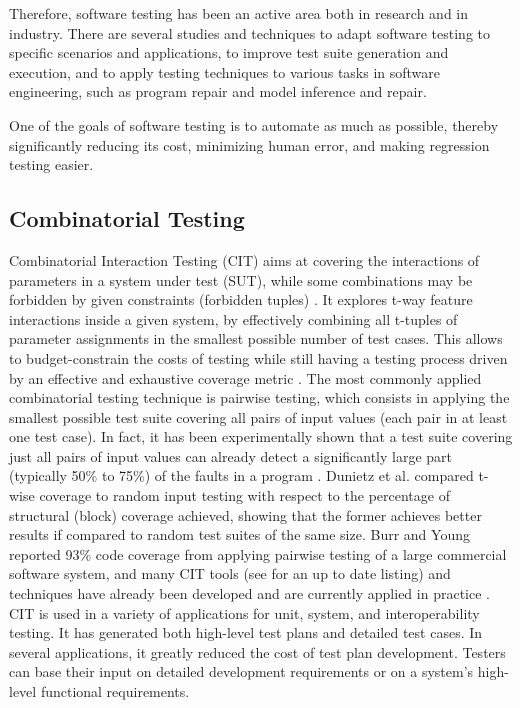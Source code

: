 \documentclass [a4paper, 12pt, twoside]{report}
\theoremstyle{plain}
\theoremstyle{definition}
\theoremstyle{remark}
\theoremstyle{plain}
\theoremstyle{plain}
\theoremstyle{remark}
\begin{document}
Therefore, software testing has been an active area both in research and in industry.
There are several studies and techniques to adapt software testing to specific scenarios and applications, to improve test suite generation and execution, and to apply testing techniques to various tasks in software engineering, such as program repair and model inference and repair. 

One of the goals of software testing is to automate as much as possible, thereby significantly reducing its cost, minimizing human error, and making regression testing easier. \cite{testingbook}

\subsection{Combinatorial Testing}
Combinatorial Interaction Testing (CIT) aims at covering the interactions of parameters in a system under test (SUT), while some combinations may be forbidden by given constraints (forbidden tuples) \cite{yamada_greedy_2016}.
It explores t-way feature interactions inside a given system, by effectively combining all t-tuples of parameter assignments in the smallest possible number of test cases.
This allows to budget-constrain the costs of testing while still having a testing process driven by an effective and exhaustive coverage metric \cite{AETG,KuhnTSE04}. 
The most commonly applied combinatorial testing technique is pairwise testing, which consists in applying the smallest possible test suite covering all pairs of input values (each pair in at least one test case). 
In fact, it has been experimentally shown that a test suite covering just all pairs of input values can already detect a significantly large part (typically 50\% to 75\%) of the faults in a program \cite{Dalal:ICSE99, IPO}.
Dunietz et al. \cite{Dunietz:ICSE97} compared t-wise coverage to random input testing with respect to the percentage of structural (block) coverage achieved, showing that the former achieves better results if compared to random test suites of the same size. 
Burr and Young \cite{burr98} reported 93\% code coverage from applying pairwise testing of a large commercial software system, and many CIT tools (see \cite{pairwise} for an up to date listing) and techniques have already been developed \cite{Dalal1998a,GrindalSTVR05,KuhnTSE04} and are currently applied in practice \cite{Brownlie1992a,Kuhn02,Smith}. 
CIT is used in a variety of applications for unit, system, and interoperability testing. 
It has generated both high-level test plans and detailed test cases. In several applications, it greatly reduced the cost of test plan development. Testers can base their input on detailed development requirements or on a system's high-level functional requirements.
\end{document}
